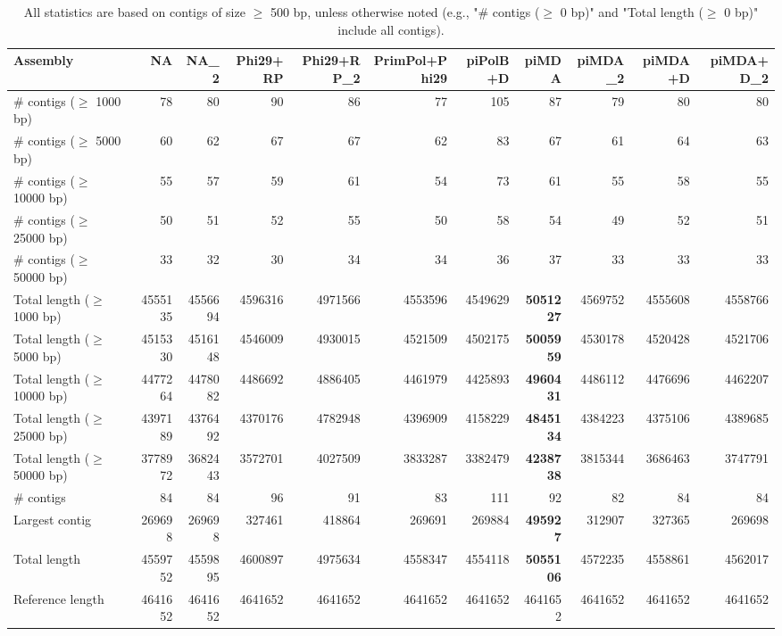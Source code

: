 \documentclass[12pt,a4paper]{article}
\begin{document}
\begin{table}[ht]
\begin{center}
\caption{All statistics are based on contigs of size $\geq$ 500 bp, unless otherwise noted (e.g., "\# contigs ($\geq$ 0 bp)" and "Total length ($\geq$ 0 bp)" include all contigs).}
\begin{tabular}{|l*{10}{|r}|}
\hline
Assembly & NA & NA\_2 & Phi29+RP & Phi29+RP\_2 & PrimPol+Phi29 & piPolB+D & piMDA & piMDA\_2 & piMDA+D & piMDA+D\_2 \\ \hline
\# contigs ($\geq$ 1000 bp) & 78 & 80 & 90 & 86 & 77 & 105 & 87 & 79 & 80 & 80 \\ \hline
\# contigs ($\geq$ 5000 bp) & 60 & 62 & 67 & 67 & 62 & 83 & 67 & 61 & 64 & 63 \\ \hline
\# contigs ($\geq$ 10000 bp) & 55 & 57 & 59 & 61 & 54 & 73 & 61 & 55 & 58 & 55 \\ \hline
\# contigs ($\geq$ 25000 bp) & 50 & 51 & 52 & 55 & 50 & 58 & 54 & 49 & 52 & 51 \\ \hline
\# contigs ($\geq$ 50000 bp) & 33 & 32 & 30 & 34 & 34 & 36 & 37 & 33 & 33 & 33 \\ \hline
Total length ($\geq$ 1000 bp) & 4555135 & 4556694 & 4596316 & 4971566 & 4553596 & 4549629 & {\bf 5051227} & 4569752 & 4555608 & 4558766 \\ \hline
Total length ($\geq$ 5000 bp) & 4515330 & 4516148 & 4546009 & 4930015 & 4521509 & 4502175 & {\bf 5005959} & 4530178 & 4520428 & 4521706 \\ \hline
Total length ($\geq$ 10000 bp) & 4477264 & 4478082 & 4486692 & 4886405 & 4461979 & 4425893 & {\bf 4960431} & 4486112 & 4476696 & 4462207 \\ \hline
Total length ($\geq$ 25000 bp) & 4397189 & 4376492 & 4370176 & 4782948 & 4396909 & 4158229 & {\bf 4845134} & 4384223 & 4375106 & 4389685 \\ \hline
Total length ($\geq$ 50000 bp) & 3778972 & 3682443 & 3572701 & 4027509 & 3833287 & 3382479 & {\bf 4238738} & 3815344 & 3686463 & 3747791 \\ \hline
\# contigs & 84 & 84 & 96 & 91 & 83 & 111 & 92 & 82 & 84 & 84 \\ \hline
Largest contig & 269698 & 269698 & 327461 & 418864 & 269691 & 269884 & {\bf 495927} & 312907 & 327365 & 269698 \\ \hline
Total length & 4559752 & 4559895 & 4600897 & 4975634 & 4558347 & 4554118 & {\bf 5055106} & 4572235 & 4558861 & 4562017 \\ \hline
Reference length & 4641652 & 4641652 & 4641652 & 4641652 & 4641652 & 4641652 & 4641652 & 4641652 & 4641652 & 4641652 \\ \hline

\end{tabular}
\end{center}
\end{table}
\end{document}
